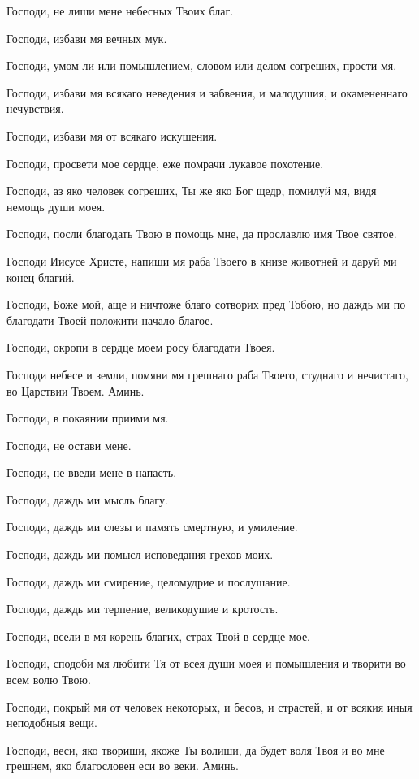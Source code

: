 

Господи, не лиши мене небесных Твоих благ.

Господи, избави мя вечных мук.

Господи, умом ли или помышлением, словом или делом согреших, прости мя.

Господи, избави мя всякаго неведения и забвения, и малодушия, и окамененнаго нечувствия.

Господи, избави мя от всякаго искушения.

Господи, просвети мое сердце, еже помрачи лукавое похотение.

Господи, аз яко человек согреших, Ты же яко Бог щедр, помилуй мя, видя немощь души моея.

Господи, посли благодать Твою в помощь мне, да прославлю имя Твое святое.


Господи Иисусе Христе, напиши мя раба Твоего в книзе животней и даруй ми конец благий.

Господи, Боже мой, аще и ничтоже благо сотворих пред Тобою, но даждь ми по благодати Твоей положити начало благое.


Господи, окропи в сердце моем росу благодати Твоея.


Господи небесе и земли, помяни мя грешнаго раба Твоего, студнаго и нечистаго, во Царствии Твоем. Аминь.

Господи, в покаянии приими мя.


Господи, не остави мене.

Господи, не введи мене в напасть.

Господи, даждь ми мысль благу.

Господи, даждь ми слезы и память смертную, и умиление.


Господи, даждь ми помысл исповедания грехов моих.


Господи, даждь ми смирение, целомудрие и послушание.


Господи, даждь ми терпение, великодушие и кротость.


Господи, всели в мя корень благих, страх Твой в сердце мое.


Господи, сподоби мя любити Тя от всея души моея и помышления и творити во всем волю Твою.

Господи, покрый мя от человек некоторых, и бесов, и страстей, и от всякия иныя неподобныя вещи.

Господи, веси, яко твориши, якоже Ты волиши, да будет воля Твоя и во мне грешнем, яко благословен еси во веки. Аминь.


